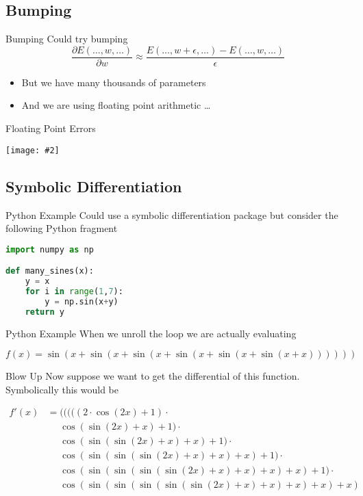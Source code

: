 \documentclass{beamer}
\newcommand {\framedgraphic}[2] {
    \begin{frame}{#1}
        \begin{center}
            \texttt{[image: \#2]}
        \end{center}
    \end{frame}
}
\begin{document}
\subsection{Bumping}

\begin{frame}{Bumping}
Could try bumping
$$
\frac{\partial E(\ldots, w, \ldots)}{\partial w} \approx \frac{E(\ldots, w + \epsilon, \ldots) - E(\ldots, w, \ldots)}{\epsilon}
$$
\begin{itemize}
\item
But we have many thousands of parameters
\item
And we are using floating point arithmetic \ldots
\end{itemize}
\end{frame}

\framedgraphic{Floating Point Errors}{diagrams/13a2bd186a0e123f040da9491fa98684.png}

\subsection{Symbolic Differentiation}

\begin{frame}[fragile]{Python Example}
  Could use a symbolic differentiation package but consider the
  following Python fragment
\begin{lstlisting}[language=Python]
import numpy as np

def many_sines(x):
    y = x
    for i in range(1,7):
        y = np.sin(x+y)
    return y
\end{lstlisting}
\end{frame}

\begin{frame}[fragile]{Python Example}
When we unroll the loop we are actually evaluating

$$
f(x) = \sin(x + \sin(x + \sin(x + \sin(x + \sin(x + \sin(x + x))))))
$$

\end{frame}

\begin{frame}[fragile]{Blow Up}
Now suppose we want to get the differential of this
function. Symbolically this would be

$$
\begin{aligned}
f'(x) &=           (((((2\cdot \cos(2x)+1)\cdot \\
      &\phantom{=} \cos(\sin(2x)+x)+1)\cdot \\
      &\phantom{=} \cos(\sin(\sin(2x)+x)+x)+1)\cdot \\
      &\phantom{=} \cos(\sin(\sin(\sin(2x)+x)+x)+x)+1)\cdot \\
      &\phantom{=} \cos(\sin(\sin(\sin(\sin(2x)+x)+x)+x)+x)+1)\cdot \\
      &\phantom{=} \cos(\sin(\sin(\sin(\sin(\sin(2x)+x)+x)+x)+x)+x)
\end{aligned}
$$
\end{frame}
\end{document}
